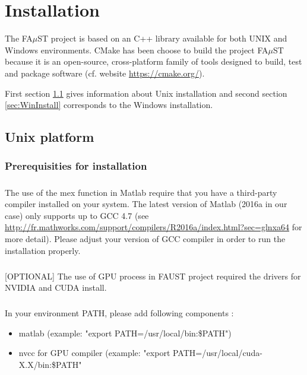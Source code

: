 \chapter{Installation}\label{sec:install}

The FA$\mu$ST project is based on an C++ library available for both UNIX and Windows environments. CMake has been choose to build the project FA$\mu$ST because it is an open-source, cross-platform family of tools designed to build, test and package software (cf. website \url{https://cmake.org/}).

First section \ref{sec:UnixInstall} gives information about Unix installation and second section \ref{sec:WinInstall} corresponds to the Windows installation. 

\section{Unix platform}\label{sec:UnixInstall}

\subsection{Prerequisities for installation}\label{sec:UnixPrerequisitiesInstall}
  

\paragraph{}The use of the mex function in Matlab require that you have a third-party compiler installed on your system. The latest version of Matlab (2016a in our case) only supports up to GCC 4.7 (see \url{http://fr.mathworks.com/support/compilers/R2016a/index.html?sec=glnxa64} for more detail). Please adjust your version of GCC compiler in order to run the installation properly. 

\paragraph{}[OPTIONAL] The use of GPU process in FAUST project required the drivers for NVIDIA and CUDA install.


\paragraph{}In your environment PATH, please add following components :
\begin{itemize}
\item matlab (example: "export PATH=/usr/local/bin:\$PATH")
\item nvcc for GPU compiler (example: "export PATH=/usr/local/cuda-X.X/bin:\$PATH"
\end{itemize}

